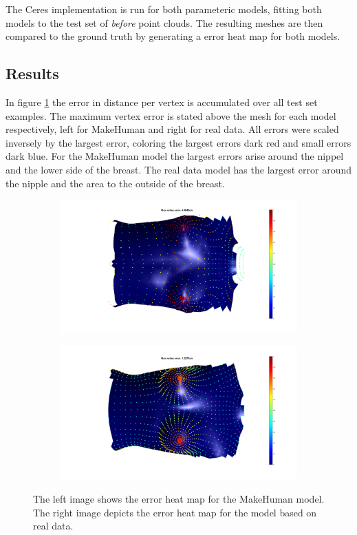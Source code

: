The Ceres implementation is run for both parameteric models, fitting both models to the test set of \textit{before} point clouds. The resulting meshes are then compared to the ground truth by generating a error heat map for both models.

\subsection{Results}
In figure \ref{fig:compparammodel} the error in distance per vertex is accumulated over all test set examples. The maximum vertex error is stated above the mesh for each model respectively, left for MakeHuman and right for real data. All errors were scaled inversely by the largest error, coloring the largest errors dark red and small errors dark blue. For the MakeHuman model the largest errors arise around the nippel and the lower side of the breast. The real data model has the largest error around the nipple and the area to the outside of the breast.

\begin{figure}
\centering
\begin{subfigure}{.5\textwidth}
  \centering
  \includegraphics[width=1\linewidth]{figures/ceresMhErrorMapBefore}
\end{subfigure}%
\begin{subfigure}{.5\textwidth}
  \centering
  \includegraphics[width=1\linewidth]{figures/ceresRealErrorMapBefore}
\end{subfigure}
\caption[Parametric model comparison]{The left image shows the error heat map for the MakeHuman model. The right image depicts the error heat map for the model based on real data.}
\label{fig:compparammodel}
\end{figure}

